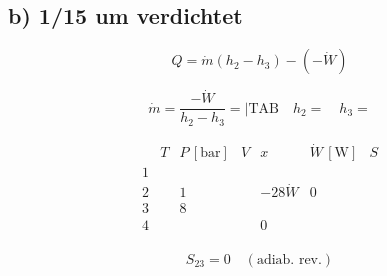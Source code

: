 \subsection*{b) 1/15 um verdichtet}

\[
Q = \dot{m}(h_{2} - h_{3}) - (-\dot{W})
\]

\[
\dot{m} = \frac{-\dot{W}}{h_{2} - h_{3}} = \left| \text{TAB} \quad h_{2} = \quad h_{3} = \right.
\]

\[
\begin{array}{c|ccccc}
 & T & P \, [\text{bar}] & V & x & \dot{W} \, [\text{W}] & S \\
\hline
1 & & & & & & \\
2 & & 1 & & -28\dot{W} & 0 \\
3 & & 8 & & & & \\
4 & & & & 0 & & \\
\end{array}
\]

\[
S_{23} = 0 \quad (\text{adiab. rev.})
\]